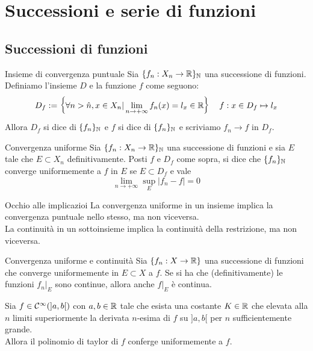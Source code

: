 \documentclass{article}
\begin{document}
\section{Successioni e serie di funzioni}

\subsection{Successioni di funzioni}

\begin{definition}{Insieme di convergenza puntuale}{}
    Sia $\{f_n :X_n\to\mathbb{R}\}_{\mathbb{N}}$ una successione di funzioni. Definiamo l'insieme $D$ e la funzione $f$ come seguono:
    \[D_f := \left\{\forall n>\hat{n}, x \in X_n | \lim_{n\to+\infty} f_n(x) = l_x \in \mathbb{R} \right\} \quad f : x\in D_f \mapsto l_x\]
    Allora $D_f$ si dice  di $\{f_n\}_{\mathbb{N}}$ e $f$ si dice  di $\{f_n\}_{\mathbb{N}}$ e scriviamo $f_n \to f$ in $D_f$.
\end{definition}
    
\begin{definition}{Convergenza uniforme}{}
    Sia $\{f_n :X_n\to\mathbb{R}\}_{\mathbb{N}}$ una successione di funzioni e sia $E$ tale che $E \subset X_n$ definitivamente. Posti $f$ e $D_f$ come sopra, si dice che $\{f_n\}_{\mathbb{N}}$ converge uniformemente a $f$ in $E$ se $E\subset D_f$ e vale
    \[\lim_{n\to +\infty} \sup_E|f_n - f| = 0\]
\end{definition}

\begin{remark}{Occhio alle implicazioi}{}
    La convergenza uniforme in un insieme implica la convergenza puntuale nello stesso, ma non viceversa.\\
    La continuità in un sottoinsieme implica la continuità della restrizione, ma non viceversa.
\end{remark}

\begin{theorem}{Convergenza uniforme e continuità}{}
    Sia $\{f_n : X \to \mathbb{R}\}$ una successione di funzioni che converge uniformemente in $E\subset X$ a $f$. Se si ha che (definitivamente) le funzioni $f_n|_E$ sono continue, allora anche $f|_E$ è continua.
\end{theorem}

\begin{theorem}
    Sia $f \in \mathcal{C}^\infty(]a,b[)$ con $a,b \in \mathbb{R}$ tale che esista una costante $K \in \mathbb{R}$ che elevata alla $n$ limiti superiormente la derivata $n$-esima di $f$ su $]a,b[$ per $n$ sufficientemente grande.\\
    Allora il polinomio di taylor di $f$ conferge uniformemente a $f$.
\end{theorem}
\end{document}
